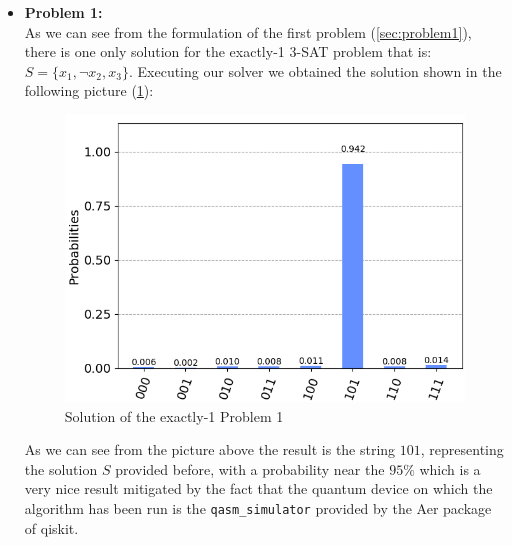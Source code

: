\documentclass[english]{article}
\begin{document}
				\begin{itemize}
					\item \textbf{Problem 1:} \\
						As we can see from the formulation of the first problem (\ref{sec:problem1}), there is one only solution for the exactly-1 3-SAT problem that is: $S=\{x_1, \neg x_2, x_3\}$. Executing our solver we obtained the solution shown in the following picture (\ref{fig:problem1Solution}):
						\begin{figure}[h]
							\centering
							\includegraphics[scale=0.42]{Problem_1_Solution.png}
							\caption{
								\label{fig:problem1Solution}
								Solution of the exactly-1 Problem 1 
							}
						\end{figure}
					
						As we can see from the picture above the result is the string $101$, representing the solution $S$ provided before, with a probability near the $95\%$ which is a very nice result mitigated by the fact that the quantum device on which the algorithm has been run is the \texttt{qasm\_simulator} provided by the Aer package of qiskit.
					

\end{itemize}
\end{document}
